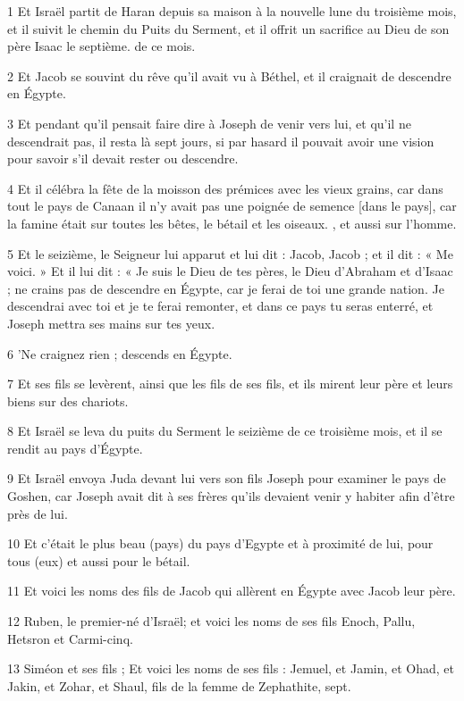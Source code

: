 \par 1 Et Israël partit de Haran depuis sa maison à la nouvelle lune du troisième mois, et il suivit le chemin du Puits du Serment, et il offrit un sacrifice au Dieu de son père Isaac le septième. de ce mois.
\par 2 Et Jacob se souvint du rêve qu'il avait vu à Béthel, et il craignait de descendre en Égypte.
\par 3 Et pendant qu'il pensait faire dire à Joseph de venir vers lui, et qu'il ne descendrait pas, il resta là sept jours, si par hasard il pouvait avoir une vision pour savoir s'il devait rester ou descendre.
\par 4 Et il célébra la fête de la moisson des prémices avec les vieux grains, car dans tout le pays de Canaan il n'y avait pas une poignée de semence [dans le pays], car la famine était sur toutes les bêtes, le bétail et les oiseaux. , et aussi sur l'homme.
\par 5 Et le seizième, le Seigneur lui apparut et lui dit : Jacob, Jacob ; et il dit : « Me voici. » Et il lui dit : « Je suis le Dieu de tes pères, le Dieu d'Abraham et d'Isaac ; ne crains pas de descendre en Égypte, car je ferai de toi une grande nation. Je descendrai avec toi et je te ferai remonter, et dans ce pays tu seras enterré, et Joseph mettra ses mains sur tes yeux.
\par 6 'Ne craignez rien ; descends en Égypte.
\par 7 Et ses fils se levèrent, ainsi que les fils de ses fils, et ils mirent leur père et leurs biens sur des chariots.
\par 8 Et Israël se leva du puits du Serment le seizième de ce troisième mois, et il se rendit au pays d'Égypte.
\par 9 Et Israël envoya Juda devant lui vers son fils Joseph pour examiner le pays de Goshen, car Joseph avait dit à ses frères qu'ils devaient venir y habiter afin d'être près de lui.
\par 10 Et c'était le plus beau (pays) du pays d'Egypte et à proximité de lui, pour tous (eux) et aussi pour le bétail.
\par 11 Et voici les noms des fils de Jacob qui allèrent en Égypte avec Jacob leur père.
\par 12 Ruben, le premier-né d'Israël; et voici les noms de ses fils Enoch, Pallu, Hetsron et Carmi-cinq.
\par 13 Siméon et ses fils ; Et voici les noms de ses fils : Jemuel, et Jamin, et Ohad, et Jakin, et Zohar, et Shaul, fils de la femme de Zephathite, sept.
